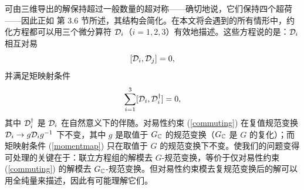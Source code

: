 可由三维导出的解保持超过一般数量的超对称——确切地说，它们保持四个超荷——因此正如 \cite{fiveknots} 第 3.6 节所述，其结构会简化。在本文将会遇到的所有情形中，约化方程都可以用三个微分算符 ${\mathcal D}_i$（$i=1,2,3$）有效地描述。这些方程说的是：${\mathcal D}_i$ 相互对易
\begin{equation}\label{commuting}[{\mathcal D}_i,{\mathcal D}_j]=0,\end{equation}
并满足矩映射条件
\begin{equation}\label{momentmap}\sum_{i=1}^3 [{\mathcal D}_i,{\mathcal D}_i^\dagger]=0,\end{equation}
其中 ${\mathcal D}_i^\dagger $ 是 ${\mathcal D}_i$ 在自然意义下的伴随。对易性约束 (\ref{commuting}) 在复值规范变换 ${\mathcal D}_i\to g{\mathcal D}_i g^{-1}$ 下不变，其中 $g$ 是取值于 $G_{\mathbb C}$ 的规范变换（$G_{\mathbb C}$ 是 $G$ 的复化）；而矩映射条件 (\ref{momentmap}) 只在取值于 $G$ 的规范变换下不变。使我们的问题变得可处理的关键在于：联立方程组的解模去 $G$-规范变换，等价于仅对易性约束 (\ref{commuting}) 的解模去 $G_{\mathbb C}$-规范变换。但对易性约束模去复规范变换后的解可以用全纯量来描述，因此有可能理解它们。

